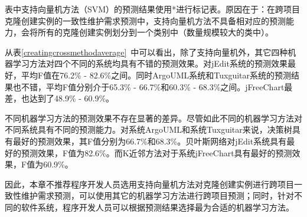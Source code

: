表中支持向量机方法（SVM）的预测结果使用{*}进行标记表。原因在于：在跨项目克隆创建实例的一致性维护需求预测中，支持向量机方法不具备相对应的预测能力，会将所有的克隆创建实例划分到一个类别中（数量规模较大的类中）。

从表\ref{creatingcrossmethodaverage}~中可以看出，除了支持向量机外，其它四种机器学习方法对四个不同的系统均具有不错的预测效果。对jEdit系统的预测效果最好，平均F值在76.2\% - 82.6\%之间。同时ArgoUML系统和Tuxguitar系统的预测结果也不错，平均F值分别介于65.3\% - 66.7\%和60.3\% - 68.3\%之间。jFreeChart最差，也达到了48.9\% - 60.9\%。

不同机器学习方法的预测效果不存在显著的差异。尽管如此不同的机器学习方法对不同系统具有不同的预测能力。对系统ArgoUML和系统Tuxguitar来说，决策树具有最好的预测效果，其F值分别为66.7\%和68.3\%。贝叶斯网络对jEdit系统具有最好的预测效果，F值为82.6\%。而K近邻方法对于系统jFreeChart具有最好的预测效果，F值为60.9\%。

因此，本章不推荐程序开发人员选用支持向量机方法对克隆创建实例进行跨项目一致性维护需求预测，可以使用其它的机器学习方法进行跨项目预测；同时，针对不同的软件系统，程序开发人员可以根据预测结果选择最为合适的机器学习方法。

